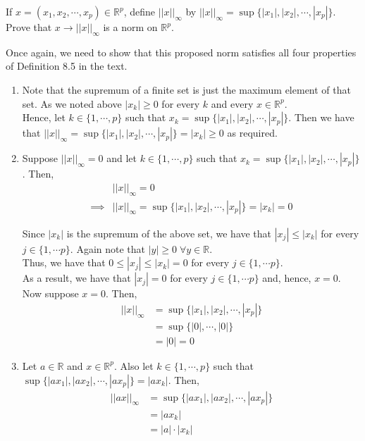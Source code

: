 \documentclass[12pt]{article}
\newenvironment{problem}[2][Problem]{\begin{trivlist}
\item[\hskip \labelsep {\bfseries #1}\hskip \labelsep {\bfseries #2.}]}{\end{trivlist}}
\begin{document}
\begin{problem}{8.G} If $x = (x_1, x_2, \cdots, x_p) \in \mathbb{R}^p$, define $||x||_{\infty}$ by $||x||_{\infty} = \sup\{|x_1|, |x_2|, \cdots, |x_p|\}$. Prove that $x \to ||x||_{\infty}$ is a norm on $\mathbb{R}^p$.
\end{problem}

Once again, we need to show that this proposed norm satisfies all four properties of Definition 8.5 in the text.

\begin{enumerate}

\item Note that the supremum of a finite set is just the maximum element of that set. As we noted above $|x_k| \geq 0$ for every $k$ and every $x \in \mathbb{R}^p$.\\

Hence, let $k \in \{1, \cdots, p\}$ such that $x_k = \sup\{|x_1|, |x_2|, \cdots, |x_p|\}$. Then we have that $||x||_{\infty} = \sup\{|x_1|, |x_2|, \cdots, |x_p|\} = |x_k| \geq 0$ as required.

\item Suppose $||x||_{\infty} = 0$ and let $k \in \{1, \cdots, p\}$ such that $x_k = \sup\{|x_1|, |x_2|, \cdots, |x_p|\}$. Then,
\begin{align*}
&||x||_{\infty} = 0\\
\implies &||x||_{\infty} = \sup\{|x_1|, |x_2|, \cdots, |x_p|\} = |x_k| = 0
\end{align*}

Since $|x_k|$ is the supremum of the above set, we have that $|x_j| \leq |x_k|$ for every $j \in \{1, \cdots p\}$. Again note that $|y| \geq 0 \; \forall y \in \mathbb{R}$.\\

Thus, we have that $0 \leq |x_j| \leq |x_k| = 0$ for every $j \in \{1, \cdots p\}$.\\

As a result, we have that $|x_j| = 0$ for every $j \in \{1, \cdots p\}$ and, hence, $x = 0$.\\

Now suppose $x = 0$. Then,
\begin{align*}
||x||_{\infty} &= \sup\{|x_1|, |x_2|, \cdots, |x_p|\}\\
&= \sup\{|0|, \cdots, |0|\}\\
&= |0| = 0
\end{align*}

\item Let $a \in \mathbb{R}$ and $x \in \mathbb{R}^p$. Also let $k \in \{1, \cdots, p\}$ such that $\sup\{|ax_1|, |ax_2|, \cdots, |ax_p|\} = |ax_k|$. Then,
\begin{align*}
||ax||_{\infty} &= \sup\{|ax_1|, |ax_2|, \cdots, |ax_p|\}\\
&= |ax_k|\\
&= |a| \cdot |x_k|
\end{align*}


\end{enumerate}
\end{document}
